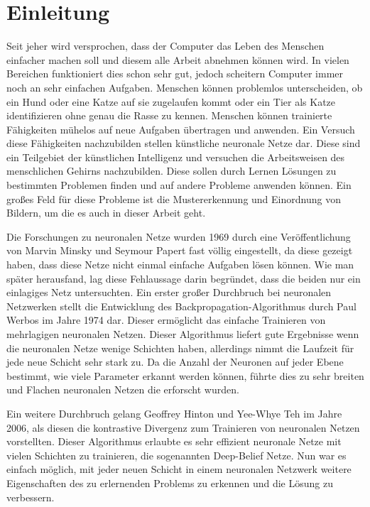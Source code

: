\documentclass[12pt]{article}
\begin{document}
	\newpage

	\tableofcontents
	
	\newpage
	\section{Einleitung}
	Seit jeher wird versprochen, dass der Computer das Leben des Menschen einfacher machen soll und diesem alle Arbeit abnehmen können wird. In vielen Bereichen funktioniert dies schon sehr gut, jedoch scheitern Computer immer noch an sehr einfachen Aufgaben. Menschen können problemlos unterscheiden, ob ein Hund oder eine Katze auf sie zugelaufen kommt oder ein Tier als Katze identifizieren ohne genau die Rasse zu kennen. Menschen können trainierte Fähigkeiten mühelos auf neue Aufgaben übertragen und anwenden.
	Ein Versuch diese Fähigkeiten nachzubilden stellen künstliche neuronale Netze dar. Diese sind ein Teilgebiet der künstlichen Intelligenz und versuchen die Arbeitsweisen des menschlichen Gehirns nachzubilden. Diese sollen durch Lernen Lösungen zu bestimmten Problemen finden und auf andere Probleme anwenden können. Ein großes Feld für diese Probleme ist die Mustererkennung und Einordnung von Bildern, um die es auch in dieser Arbeit geht. 
	
	Die Forschungen zu neuronalen Netze wurden 1969 durch eine Veröffentlichung von Marvin Minsky und Seymour Papert fast völlig eingestellt, da diese gezeigt haben, dass diese Netze nicht einmal einfache Aufgaben lösen können. Wie man später herausfand, lag diese Fehlaussage darin begründet, dass die beiden nur ein einlagiges Netz untersuchten. Ein erster großer Durchbruch bei neuronalen Netzwerken stellt die Entwicklung des Backpropagation-Algorithmus durch Paul Werbos im Jahre 1974 dar. Dieser ermöglicht das einfache Trainieren von mehrlagigen neuronalen Netzen. Dieser Algorithmus liefert gute Ergebnisse wenn die neuronalen Netze wenige Schichten haben, allerdings nimmt die Laufzeit für jede neue Schicht sehr stark zu. Da die Anzahl der Neuronen auf jeder Ebene bestimmt, wie viele Parameter erkannt werden können, führte dies zu sehr breiten und Flachen neuronalen Netzen die erforscht wurden.
	
	Ein weitere Durchbruch gelang Geoffrey Hinton und Yee-Whye Teh im Jahre 2006, als diesen die kontrastive Divergenz zum Trainieren von neuronalen Netzen  vorstellten. Dieser Algorithmus erlaubte es sehr effizient neuronale Netze mit vielen Schichten zu trainieren, die sogenannten Deep-Belief Netze. Nun war es einfach möglich, mit jeder neuen Schicht in einem neuronalen Netzwerk weitere Eigenschaften des zu erlernenden Problems zu erkennen und die Lösung zu verbessern. 
	
\end{document}
